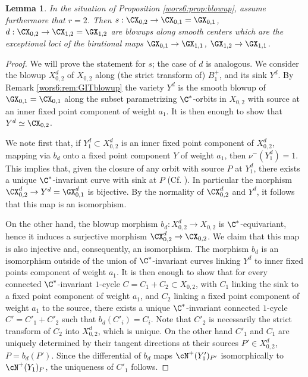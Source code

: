 \documentclass[reqno]{amsproc}
\newtheorem{lemma}[theorem]{Lemma}
\theoremstyle{definition}
\def\prul{s}
\def\prur{d}
\begin{document}
\begin{lemma}\label{wors6:lem:blowup1}
In the situation of Proposition \ref{wors6:prop:blowup}, assume furthermore that $r=2$. Then $\prul:\CX_{0,2}
\to\CX_{0,1}=\GX_{0,1}$,  $\prur:\CX_{0,2}
\to\CX_{1,2}=\GX_{1,2}$ are blowups along smooth centers which are the exceptional loci of the birational maps $\GX_{0,1} \to \GX_{1,1}$, $\GX_{1,2} \to \GX_{1,1}$.
\end{lemma}

\begin{proof} 
We will prove the statement for $\prul$; the case of $\prur$ is analogous. We consider the blowup $X^\prur_{0,2}$ of $X_{0,2}$ along (the strict transform of) $B^+_1$, and its sink $Y^\prur$. By Remark \ref{wors6:rem:GITblowup} the variety  $Y^\prur$ is the smooth blowup of  $\GX_{0,1}=\CX_{0,1}$ along the subset parametrizing $\C^*$-orbits in $X_{0,2}$ with %
source at an inner fixed point component of weight $a_1$. It is then enough to show that $Y^\prur\simeq \CX_{0,2}$. 

We note first that, if $Y^\prur_1 \subset X^\prur_{0,2}$ is %
an inner fixed point component of $X^\prur_{0,2}$, mapping via $b_\prur$ onto a fixed point component $Y$ of weight $a_1$, then $\nu^-(Y^\prur_1)=1$. This implies that, given the closure of any orbit with source $P$ at $Y^\prur_1$, there exists a unique $\C^*$-invariant curve with sink at $P$ (Cf. \cite[Lemma 2.2]{wors6-WORS5}). In particular the morphism $\CX^\prur_{0,2}\to Y^\prur=\GX^\prur_{0,1}$ is bijective. By the normality of $\CX^\prur_{0,2}$ and $Y^\prur$, it follows that this map is an isomorphism.

On the other hand, the blowup morphism $b_\prur:X^\prur_{0,2} \to X_{0,2}$ is $\C^*$-equivariant, hence it induces a surjective morphism $\CX^\prur_{0,2}\to \CX_{0,2}$. We claim that this map is also injective and, consequently, an isomorphism. The morphism $b_\prur$ is an isomorphism outside of the union of $\C^*$-invariant curves linking $Y^\prur$ to inner fixed points component of weight $a_1$. It is  then enough to show that for every connected $\C^*$-invariant $1$-cycle $C=C_1+ C_2  \subset X_{0,2}$, with $C_1$ linking the sink to a fixed point component of weight $a_1$, and $C_2$ linking a fixed point component of weight $a_1$ to the source, there exists a unique $\C^*$-invariant connected $1$-cycle $C'=C'_1+ C'_2$ such that  $b_\prur(C'_i)=C_i$. Note that $C'_2$ is necessarily the strict transform of $C_2$ into $X^\prur_{0,2}$, which is unique. On the other hand $C'_1$ and $C_1$ are uniquely determined by their tangent directions at their sources $P'\in X^\prur_{0,2}$, $P=b_\prur(P')$. Since the differential of $b_\prur$ maps $\cN^+(Y'_1)_{P'}$ isomorphically to $\cN^+(Y_1)_P$, the uniqueness of $C'_1$ follows.
\end{proof}
\end{document}
